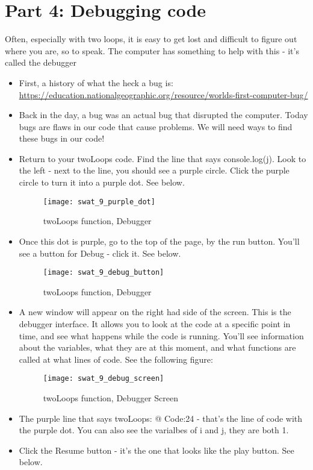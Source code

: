 \documentclass{article}
\begin{document}
\section*{Part 4: Debugging code}
Often, especially with two loops, it is easy to get lost and difficult to figure out where you are, so to speak.  The computer has something to help with this - it's called the debugger
\begin{itemize}
    \item First, a history of what the heck a bug is:  \url{https://education.nationalgeographic.org/resource/worlds-first-computer-bug/}
    \item Back in the day, a bug was an actual bug that disrupted the computer.  Today bugs are flaws in our code that cause problems.  We will need ways to find these bugs in our code!
    \item Return to your twoLoops code.  Find the line that says console.log(j).  Look to the left - next to the line, you should see a purple circle.  Click the purple circle to turn it into a purple dot.  See below.
    \begin{figure}[H]
  		\centering
  		\texttt{[image: swat\_9\_purple\_dot]}
  		\caption{twoLoops function, Debugger}
	\end{figure}
	\item Once this dot is purple, go to the top of the page, by the run button.  You'll see a button for Debug - click it.  See below.
	\begin{figure}[H]
  		\centering
  		\texttt{[image: swat\_9\_debug\_button]}
  		\caption{twoLoops function, Debugger}
	\end{figure}
	\item A new window will appear on the right had side of the screen.  This is the debugger interface.  It allows you to look at the code at a specific point in time, and see what happens while the code is running.  You'll see information about the variables, what they are at this moment, and what functions are called at what lines of code.  See the following figure:
	\begin{figure}[H]
  		\centering
  		\texttt{[image: swat\_9\_debug\_screen]}
  		\caption{twoLoops function, Debugger Screen}
	\end{figure}
	\item The purple line that says twoLoops: @ Code:24 - that's the line of code with the purple dot.  You can also see the varialbes of i and j, they are both 1.
	\item Click the Resume button - it's the one that looks like the play button.  See below.

\end{itemize}
\end{document}
